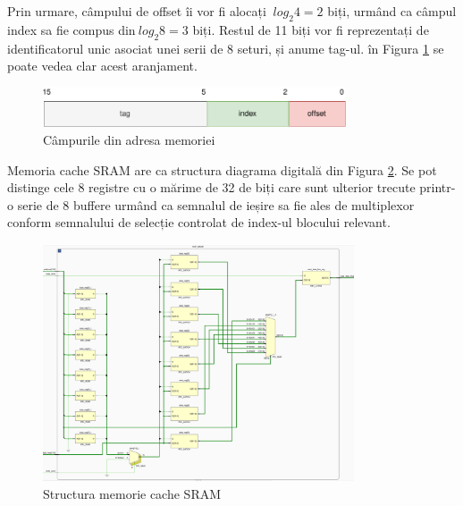 \documentclass[12pt]{article}
\begin{document}
Prin urmare, câmpului de offset îi vor fi alocați $\  log_2 4 = 2 $ biți, urmând ca câmpul index sa fie compus din$\  log_2 8 = 3 $ biți. Restul de 11 biți vor fi reprezentați de identificatorul unic asociat unei serii de 8 seturi, și anume tag-ul. în Figura \ref{Figura:54} se poate vedea clar acest aranjament.

 \begin{figure}[h!]
 \includegraphics[width=0.8\textwidth]{cache16bit.pdf}
 \centering
 \caption{Câmpurile din adresa memoriei}
 \label{Figura:54}
 \end{figure}

Memoria cache SRAM are ca structura diagrama digitală din Figura \ref{Figura:55}. Se pot distinge cele 8 registre cu o mărime de 32 de biți care sunt ulterior trecute printr-o serie de 8 buffere urmând ca semnalul de ieșire sa fie ales de multiplexor conform semnalului de selecție controlat de index-ul blocului relevant.

 \newpage
 \begin{figure}[h!]
 \includegraphics[width=0.82\textwidth]{cachesram.png}
 \centering
 \caption{Structura memorie cache SRAM}
 \label{Figura:55}
 \end{figure}
 
\end{document}
